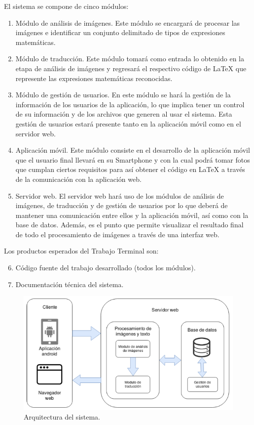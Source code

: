 El sistema se compone de cinco módulos:
\begin{enumerate}
    \item Módulo de análisis de imágenes. Este módulo se encargará de procesar las imágenes e identificar un conjunto delimitado de tipos de expresiones matemáticas.
    \item Módulo de traducción. Este módulo tomará como entrada lo obtenido en la etapa de análisis de imágenes y regresará el respectivo código de LaTeX que represente las expresiones matemáticas reconocidas.
    
    \item Módulo de gestión de usuarios. En este módulo se hará la gestión de la información de los usuarios de la aplicación, lo que implica tener un control de su información y de los archivos que generen al usar el sistema. Esta gestión de usuarios estará presente tanto en la aplicación móvil como en el servidor web.

    \item Aplicación móvil. Este módulo consiste en el desarrollo de la aplicación móvil que el usuario final llevará en su Smartphone y con la cual podrá tomar fotos que cumplan ciertos requisitos para así obtener el código en LaTeX a través de la comunicación con la aplicación web.

    \item Servidor web. El servidor web hará uso de los módulos de análisis de imágenes, de traducción y de gestión de usuarios por lo que deberá de mantener una comunicación entre ellos y la aplicación móvil, así como con la base de datos. Además, es el punto que permite visualizar el resultado final de todo el procesamiento de imágenes a través de una interfaz web.
\end{enumerate}
Los productos esperados del Trabajo Terminal son:
\begin{enumerate}
    \setcounter{enumi}{5}
    \item Código fuente del trabajo desarrollado (todos los módulos).
    \item Documentación técnica del sistema.
\end{enumerate}

\begin{figure}[h]
\centering
\includegraphics[width=1.0\textwidth]{capitulo1/images/arquitectura.png}
\caption{Arquitectura del sistema.}
\label{fig:arquitecturaInicial}
\end{figure}
\newpage


